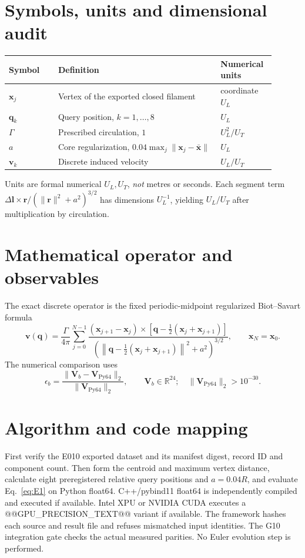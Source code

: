 \documentclass[11pt,a4paper]{article}
\begin{document}
\section{Symbols, units and dimensional audit}
\begin{longtable}{p{0.17\linewidth}p{0.57\linewidth}p{0.16\linewidth}}\toprule
Symbol & Definition & Numerical units \\ \midrule
$\mathbf{x}_j$ & Vertex of the exported closed filament & coordinate $U_L$ \\
$\mathbf{q}_k$ & Query position, $k=1,\ldots,8$ & $U_L$ \\
$\Gamma$ & Prescribed circulation, $1$ & $U_L^2/U_T$ \\
$a$ & Core regularization, $0.04\max_j\|\mathbf{x}_j-\bar{\mathbf{x}}\|$ & $U_L$ \\
$\mathbf{v}_k$ & Discrete induced velocity & $U_L/U_T$ \\ \bottomrule\end{longtable}
Units are formal numerical $U_L,U_T$, \emph{not} metres or seconds. Each segment term $\Delta\mathbf{l}\times\mathbf{r}/(\|\mathbf{r}\|^2+a^2)^{3/2}$ has dimensions $U_L^{-1}$, yielding $U_L/U_T$ after multiplication by circulation.
\section{Mathematical operator and observables}
The exact discrete operator is the fixed periodic-midpoint regularized Biot--Savart formula
\begin{equation}
\mathbf{v}(\mathbf{q})=\frac{\Gamma}{4\pi}\sum_{j=0}^{N-1}
\frac{(\mathbf{x}_{j+1}-\mathbf{x}_{j})\times
[\mathbf{q}-\frac{1}{2}(\mathbf{x}_{j}+\mathbf{x}_{j+1})]}
{\left(\left\|\mathbf{q}-\frac{1}{2}(\mathbf{x}_{j}+\mathbf{x}_{j+1})\right\|^2+a^2\right)^{3/2}},\qquad \mathbf{x}_N=\mathbf{x}_0.
\label{eq:E1}
\end{equation}
The numerical comparison uses
\begin{equation}
\epsilon_b=\frac{\|\mathbf{V}_b-\mathbf{V}_{\mathrm{Py64}}\|_2}{\|\mathbf{V}_{\mathrm{Py64}}\|_2},\qquad
\mathbf{V}_b\in\mathbb{R}^{24};\quad \|\mathbf{V}_{\mathrm{Py64}}\|_2>10^{-30}.
\label{eq:E2}
\end{equation}
\section{Algorithm and code mapping}
First verify the E010 exported dataset and its manifest digest, record ID and component count. Then form the centroid and maximum vertex distance, calculate eight preregistered relative query positions and $a=0.04R$, and evaluate Eq.~\eqref{eq:E1} on Python float64. C++/pybind11 float64 is independently compiled and executed if available. Intel XPU or NVIDIA CUDA executes a @@GPU_PRECISION_TEXT@@ variant if available. The framework hashes each source and result file and refuses mismatched input identities. The G10 integration gate checks the actual measured parities. No Euler evolution step is performed.
\end{document}
